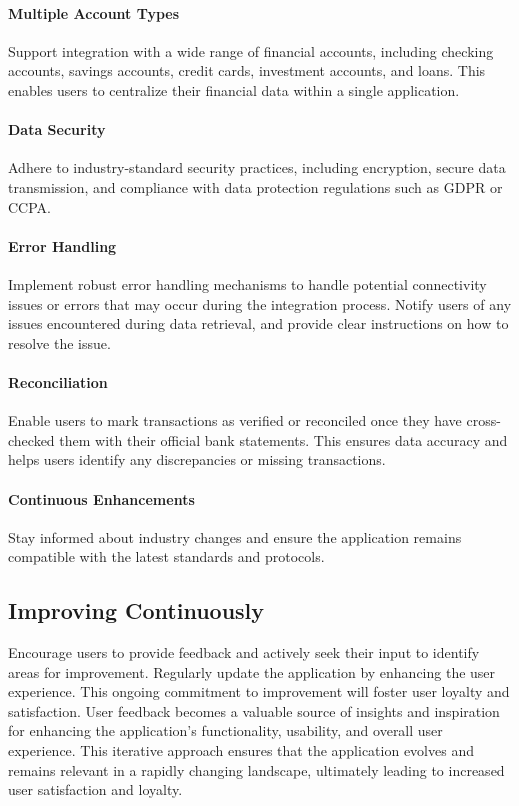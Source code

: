 \paragraph{Multiple Account Types}
Support integration with a wide range of financial accounts, including checking accounts, savings accounts, credit 
cards, investment accounts, and loans. This enables users to centralize their financial data within a single 
application.

\paragraph{Data Security}
Adhere to industry-standard security practices, including encryption, secure data transmission, and compliance with 
data protection regulations such as GDPR or CCPA.

\paragraph{Error Handling}
Implement robust error handling mechanisms to handle potential connectivity issues or errors that may occur during the 
integration process. Notify users of any issues encountered during data retrieval, and provide clear instructions on 
how to resolve the issue.

\paragraph{Reconciliation}
Enable users to mark transactions as verified or reconciled once they have cross-checked them with their official bank 
statements. This ensures data accuracy and helps users identify any discrepancies or missing transactions.

\paragraph{Continuous Enhancements}
Stay informed about industry changes and ensure the application remains compatible with the latest standards and 
protocols.


\subsection{Improving Continuously}

Encourage users to provide feedback and actively seek their input to identify areas for improvement. Regularly update 
the application by enhancing the user experience. This ongoing commitment to improvement will foster user loyalty and 
satisfaction. User feedback becomes a valuable source of insights and inspiration for enhancing the application's 
functionality, usability, and overall user experience. This iterative approach ensures that the application evolves 
and remains relevant in a rapidly changing landscape, ultimately leading to increased user satisfaction and loyalty.

